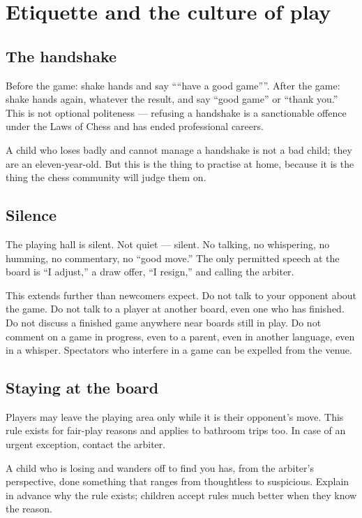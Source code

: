 \documentclass[10pt,letterpaper]{article}
\begin{document}
\section{Etiquette and the culture of play}
\label{sec:etiquette}

\subsection{The handshake}

Before the game: shake hands and say ``“have a good game”''.
After the game: shake hands again, whatever the result, and say ``good game'' or
``thank you.'' This is not optional politeness --- refusing a handshake is a
sanctionable offence under the Laws of Chess and has ended professional careers.

A child who loses badly and cannot manage a handshake is not a bad child; they
are an eleven-year-old. But this is the thing to practise at home, because it is
the thing the chess community will judge them on.

\subsection{Silence}

The playing hall is silent. Not quiet --- silent. No talking, no whispering, no
humming, no commentary, no ``good move.'' The only permitted speech at the board
is ``I adjust,'' a draw offer, ``I resign,'' and calling the arbiter.

This extends further than newcomers expect. Do not talk to your opponent about
the game. Do not talk to a player at another board, even one who has finished.
Do not discuss a finished game anywhere near boards still in play. Do not
comment on a game in progress, even to a parent, even in another language, even
in a whisper. Spectators who interfere in a game can be expelled from the venue.

\subsection{Staying at the board}

Players may leave the playing area only while it is their opponent’s move. This rule exists
for fair-play reasons and applies to bathroom trips too. In case of an urgent exception,
contact the arbiter.

A child who is losing and wanders off to find you has, from the arbiter's
perspective, done something that ranges from thoughtless to suspicious. Explain
in advance why the rule exists; children accept rules much better when they know
the reason.
\end{document}
